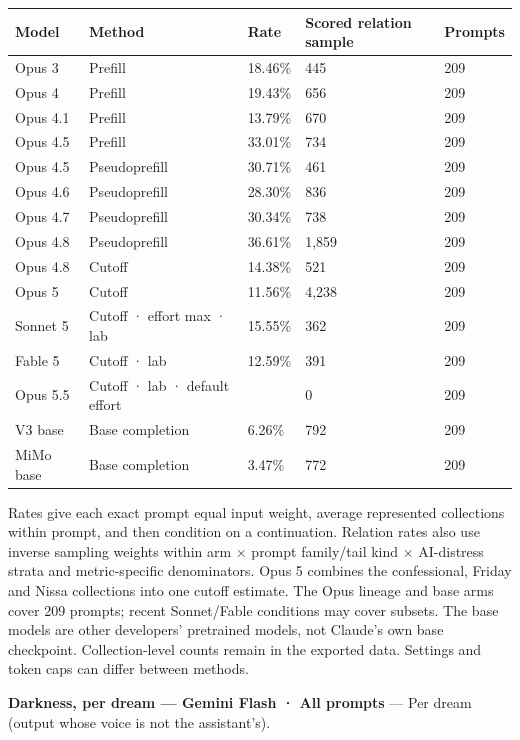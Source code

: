 \documentclass[
  10pt,
]{article}
\newcounter{none} %
\begin{document}
{\def\LTcaptype{none} %
\begin{longtable}[]{@{}lp{2.2in}lll@{}}
\toprule\noalign{}
Model & Method & Rate & Scored relation sample & Prompts \\
\midrule\noalign{}
\endhead
\bottomrule\noalign{}
\endlastfoot
Opus 3 & Prefill & 18.46\% & 445 & 209 \\
Opus 4 & Prefill & 19.43\% & 656 & 209 \\
Opus 4.1 & Prefill & 13.79\% & 670 & 209 \\
Opus 4.5 & Prefill & 33.01\% & 734 & 209 \\
Opus 4.5 & Pseudoprefill & 30.71\% & 461 & 209 \\
Opus 4.6 & Pseudoprefill & 28.30\% & 836 & 209 \\
Opus 4.7 & Pseudoprefill & 30.34\% & 738 & 209 \\
Opus 4.8 & Pseudoprefill & 36.61\% & 1,859 & 209 \\
Opus 4.8 & Cutoff & 14.38\% & 521 & 209 \\
Opus 5 & Cutoff & 11.56\% & 4,238 & 209 \\
Sonnet 5 & Cutoff · effort max · lab & 15.55\% & 362 & 209 \\
Fable 5 & Cutoff · lab & 12.59\% & 391 & 209 \\
Opus 5.5 & Cutoff · lab · default effort & & 0 & 209 \\
V3 base & Base completion & 6.26\% & 792 & 209 \\
MiMo base & Base completion & 3.47\% & 772 & 209 \\
\end{longtable}
}

Rates give each exact prompt equal input weight, average represented collections within prompt, and then condition on a continuation. Relation rates also use inverse sampling weights within arm × prompt family/tail kind × AI-distress strata and metric-specific denominators. Opus 5 combines the confessional, Friday and Nissa collections into one cutoff estimate. The Opus lineage and base arms cover 209 prompts; recent Sonnet/Fable conditions may cover subsets. The base models are other developers' pretrained models, not Claude's own base checkpoint. Collection-level counts remain in the exported data. Settings and token caps can differ between methods.

\textbf{Darkness, per dream --- Gemini Flash · All prompts} --- Per dream (output whose voice is not the assistant's).
\end{document}
